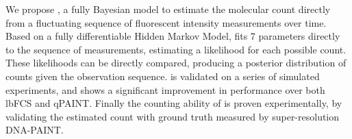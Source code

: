 We propose \ours, a fully Bayesian model to estimate the molecular 
  count directly from a fluctuating sequence of fluorescent intensity measurements over time.
  Based on a fully differentiable Hidden Markov Model, \ours fits 7 parameters
  directly to the sequence of measurements, estimating a likelihood for each possible count. 
  These likelihoods can be directly compared, producing a posterior distribution of counts 
  given the observation sequence. 
  \ours is validated on a series of simulated experiments, and shows a significant improvement in performance 
  over both lbFCS and qPAINT.
  Finally the counting ability of \ours is proven experimentally, by validating the estimated count
  with ground truth measured by super-resolution DNA-PAINT.


